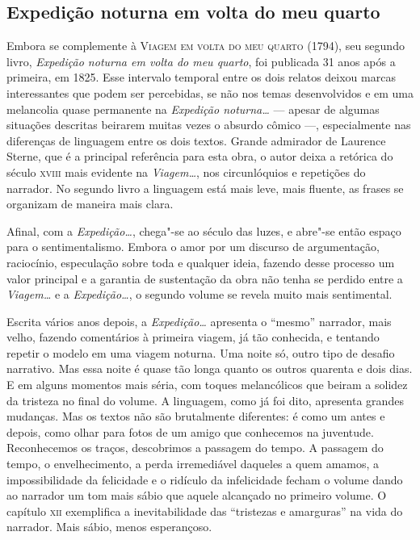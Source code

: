 \subsection{Expedição noturna em volta do meu quarto}

Embora se complemente à \textsc{Viagem em volta do meu quarto} (1794), seu segundo livro, \textit{Expedição noturna em volta do meu quarto}, foi publicada 31 anos após a primeira, em 1825. Esse intervalo temporal
entre os dois relatos deixou marcas interessantes que podem ser
percebidas, se não nos temas desenvolvidos e em uma melancolia quase
permanente na \textit{Expedição noturna\ldots} --- apesar de algumas
situações descritas beirarem muitas vezes o absurdo cômico ---,
especialmente nas diferenças de linguagem entre os dois textos. Grande
admirador de Laurence Sterne, que é a principal referência para esta
obra, o autor deixa a retórica do século \textsc{xviii} mais evidente na
\textit{Viagem\ldots}, nos circunlóquios e repetições do narrador. No
segundo livro a linguagem está mais leve, mais fluente, as frases se
organizam de maneira mais clara.

Afinal, com a \textit{Expedição\ldots}, chega"-se ao século das luzes, e abre"-se então espaço para o sentimentalismo. Embora o
amor por um discurso de argumentação, raciocínio, especulação sobre
toda e qualquer ideia, fazendo desse processo um valor principal e a
garantia de sustentação da obra não tenha se perdido entre a
\textit{Viagem\ldots} e a \textit{Expedição\ldots},  o segundo volume se
revela muito mais sentimental.

Escrita vários anos depois, a \textit{Expedição\ldots} apresenta o ``mesmo''
narrador, mais velho, fazendo comentários à primeira viagem, já tão
conhecida, e tentando repetir o modelo em uma viagem noturna. Uma noite
só, outro tipo de desafio narrativo. Mas essa noite é quase tão longa
quanto os outros quarenta e dois dias. E em alguns momentos mais séria,
com toques melancólicos que beiram a solidez da tristeza no final do
volume. A linguagem, como já foi dito, apresenta grandes mudanças. Mas
os textos não são brutalmente diferentes: é como um antes e depois,
como olhar para fotos de um amigo que conhecemos na juventude.
Reconhecemos os traços, descobrimos a passagem do tempo. A passagem do
tempo, o envelhecimento, a perda irremediável daqueles a quem amamos, a
impossibilidade da felicidade e o ridículo da infelicidade fecham o
volume dando ao narrador um tom mais sábio que aquele alcançado no
primeiro volume. O capítulo \textsc{xii} exemplifica a inevitabilidade das
``tristezas e amarguras'' na vida do narrador. Mais sábio, menos
esperançoso. 

